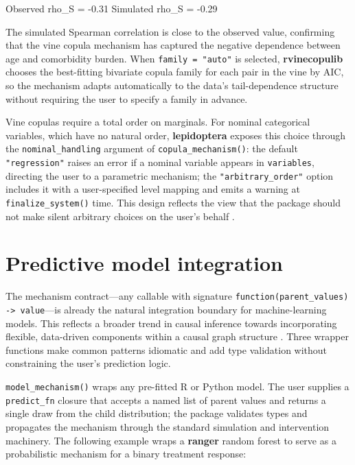 \documentclass[12pt]{article}
\newcommand{\pkg}[1]{\textbf{#1}}
\newcommand{\proglang}[1]{\textsf{#1}}
\newcommand{\code}[1]{\texttt{#1}}
\newcommand{\fct}[1]{\texttt{#1()}}
\begin{document}
\begin{CodeOutput}
Observed rho_S = -0.31   Simulated rho_S = -0.29
\end{CodeOutput}

\noindent
The simulated Spearman correlation is close to the observed value, confirming that
the vine copula mechanism has captured the negative dependence between age and
comorbidity burden. When \code{family = "auto"} is selected, \pkg{rvinecopulib}
chooses the best-fitting bivariate copula family for each pair in the vine by AIC,
so the mechanism adapts automatically to the data's tail-dependence structure
without requiring the user to specify a family in advance.

Vine copulas require a total order on marginals. For nominal categorical variables,
which have no natural order, \pkg{lepidoptera} exposes this choice through the
\code{nominal\_handling} argument of \fct{copula\_mechanism}: the default
\code{"regression"} raises an error if a nominal variable appears in
\code{variables}, directing the user to a parametric mechanism; the
\code{"arbitrary\_order"} option includes it with a user-specified level mapping
and emits a warning at \fct{finalize\_system} time. This design reflects the
view that the package should not make silent arbitrary choices on the user's behalf
\citep{pearl2009causality}.

\section{Predictive model integration}
\label{sec:models}

The mechanism contract---any callable with signature
\code{function(parent\_values) -> value}---is already the natural integration
boundary for machine-learning models. This reflects a broader trend in causal
inference towards incorporating flexible, data-driven components within a causal
graph structure \citep{scholkopf2021causal, peters2017elements}. Three wrapper
functions make common patterns idiomatic and add type validation without
constraining the user's prediction logic.

\fct{model\_mechanism} wraps any pre-fitted \proglang{R} or \proglang{Python}
model. The user supplies a \code{predict\_fn} closure that accepts a named list of
parent values and returns a single draw from the child distribution; the package
validates types and propagates the mechanism through the standard simulation and
intervention machinery. The following example wraps a \pkg{ranger} random forest
\citep{wright2017ranger, breiman2001random} to serve as a probabilistic mechanism
for a binary treatment response:
\end{document}
